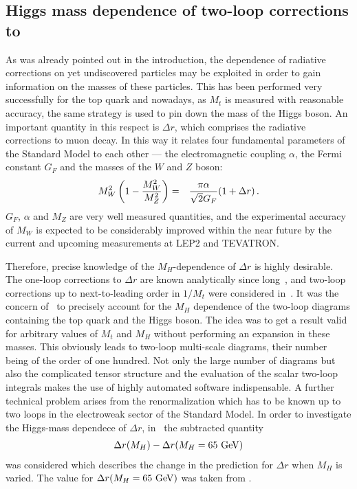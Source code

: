 %
%
%
\subsection[Higgs mass dependence of two-loop corrections to $\Delta
r$]{Higgs mass dependence of two-loop corrections to \label{sec:applic:deltar}}
%
%
As was already pointed out in the introduction, the dependence of
radiative corrections on yet undiscovered particles may be exploited in
order to gain information on the masses of these particles.  This has
been performed very successfully for the top quark and nowadays, as
$M_t$ is measured with reasonable accuracy, the same strategy is used to
pin down the mass of the Higgs boson.  An important quantity in this
respect is $\Delta r$, which comprises the radiative corrections to muon
decay. In this way it relates four fundamental parameters of the
Standard Model to each other --- the electromagnetic coupling $\alpha$,
the Fermi constant $G_F$ and the masses of the $W$ and $Z$ boson:
\begin{eqnarray}
M_W^2\left(1-{M_W^2\over M_Z^2}\right) &=& {\pi\alpha\over
    \sqrt{2}G_F}(1+\Delta r)\,.
\end{eqnarray}
$G_F$, $\alpha$ and $M_Z$ are very well measured quantities,
and the experimental accuracy of $M_W$ is expected to be
considerably improved within the near future by the current and upcoming
measurements at LEP2 and TEVATRON.

Therefore, precise knowledge of the $M_H$-dependence of $\Delta r$ is
highly desirable. The one-loop corrections to $\Delta r$ are known
analytically since long~\cite{MarSir80}, and two-loop corrections up to
next-to-leading order in $1/M_t$ were considered
in~\cite{DegGamVic96,DegGamSir97,DegGamPasSir98}.  It was the concern
of~\cite{BauWei97} to precisely account for the $M_H$ dependence of the
two-loop diagrams containing the top quark and the Higgs boson.  The
idea was to get a result valid for arbitrary values of $M_t$ and $M_H$
without performing an expansion in these masses.  This obviously leads
to two-loop multi-scale diagrams, their number being of the order of one
hundred.  Not only the large number of diagrams but also the complicated
tensor structure and the evaluation of the scalar two-loop integrals
makes the use of highly automated software indispensable.  A further
technical problem arises from the renormalization which has to be known
up to two loops in the electroweak sector of the Standard Model.  In
order to investigate the Higgs-mass dependece of $\Delta r$,
in~\cite{BauWei97} the subtracted quantity
\begin{eqnarray}
\Delta r(M_H) - \Delta r(M_H=65~{\rm GeV})
\end{eqnarray}
was considered which describes the change in the prediction for $\Delta
r$ when $M_H$ is varied.  The value for $\Delta r(M_H=65~{\rm GeV})$ was
taken from \cite{DegGamPasSir98}.

